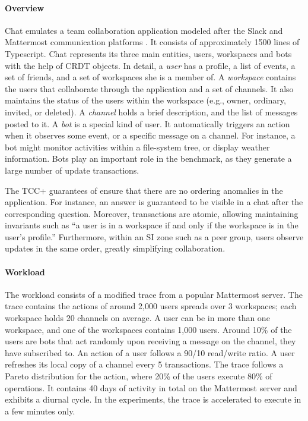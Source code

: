 
\paragraph{Overview}

\system{}Chat emulates a team collaboration application modeled after the
Slack and Mattermost communication platforms \cite{slack,mattermost}.
It consists of approximately 1500 lines of Typescript.
\system{}Chat represents its three main entities, users, 
workspaces and bots with the help of CRDT objects.
%
In detail, 
a \textit{user} has a profile, 
a list of events, 
a set of friends, 
and a set of workspaces she is a member of.
A \textit{workspace} contains the users that collaborate through the application
 and a set of channels.
It also maintains the status of the users within the workspace 
(e.g., owner, ordinary, invited, or deleted).
A \textit{channel} holds a brief description, and the list of messages
posted to it.
%
A \textit{bot} is a special kind of user.
It automatically triggers an action when it observes some event, 
or a specific message on a channel.
For instance, 
a bot might monitor activities within a file-system tree, 
or display weather information.
Bots play an important role in the benchmark, 
as they generate a large number of update transactions.

The TCC+ guarantees of \system{} ensure that there are no ordering anomalies in 
the application.
For instance, 
an answer is guaranteed to be visible in a chat after the corresponding question.
Moreover, 
transactions are atomic, 
allowing maintaining invariants such as ``a user is in a workspace if and only 
if the workspace is in the user's profile.''
Furthermore, within an SI zone such as a peer group, 
users observe updates in the same order, 
greatly simplifying collaboration.

\paragraph{Workload}
The workload consists of a modified trace from a popular Mattermost
server.
The trace contains the actions of around 2,000 users spreads over 3 workspaces; 
each workspace holds 20 channels on average.
A user can be in more than one workspace, and one of the workspaces contains 
1,000 users.
%
Around 10\% of the users are bots that act randomly upon receiving a message on 
the channel, they have subscribed to.
An action of a user follows a 90/10 read/write ratio.
A user refreshes its local copy of a channel every 5 transactions.
%
The trace follows a Pareto distribution for the action, where 20\% of the users 
execute 80\% of operations.
It contains 40 days of activity in total on the Mattermost server and exhibits 
a diurnal cycle.
In the experiments, the trace is accelerated to execute in a few minutes only.

